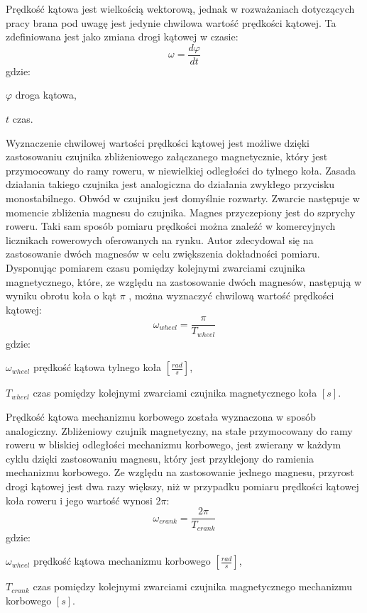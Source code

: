 Prędkość kątowa jest wielkością wektorową, jednak w rozważaniach dotyczących pracy brana pod uwagę jest jedynie chwilowa wartość prędkości kątowej. Ta zdefiniowana jest jako zmiana drogi kątowej w czasie:
\begin{equation}
    \omega = \frac{d\varphi}{dt}
    \label{eq:predkoscKatowa}
\end{equation}
gdzie:
\begin{eqwhere}[2cm]
	\item[$\varphi$] droga kątowa,
	\item[$t$] czas.
\end{eqwhere}
Wyznaczenie chwilowej wartości prędkości kątowej jest możliwe dzięki zastosowaniu czujnika zbliżeniowego załączanego magnetycznie, który jest przymocowany do ramy roweru, w niewielkiej odległości do tylnego koła. Zasada działania takiego czujnika jest analogiczna do działania zwykłego przycisku monostabilnego. Obwód w czujniku jest domyślnie rozwarty. Zwarcie następuje w momencie zbliżenia magnesu do czujnika. Magnes przyczepiony jest do szprychy roweru. Taki sam sposób pomiaru prędkości można znaleźć w komercyjnych licznikach rowerowych oferowanych na rynku. Autor zdecydował się na zastosowanie dwóch magnesów w celu zwiększenia dokładności pomiaru. Dysponując pomiarem czasu pomiędzy kolejnymi zwarciami czujnika magnetycznego, które, ze względu na zastosowanie dwóch magnesów, następują w wyniku obrotu koła o kąt $\pi$ , można wyznaczyć chwilową wartość prędkości kątowej: 
\begin{equation}
    \omega_{wheel} = \frac{\pi}{T_{wheel}}
\end{equation}
gdzie:
\begin{eqwhere}[2cm]
    \item[$\omega_{wheel}$] prędkość kątowa tylnego koła $[\frac{rad}{s}]$,
	\item[$T_{wheel}$] czas pomiędzy kolejnymi zwarciami czujnika magnetycznego koła $[s]$.
\end{eqwhere}
Prędkość kątowa mechanizmu korbowego została wyznaczona w sposób analogiczny. Zbliżeniowy czujnik magnetyczny, na stałe przymocowany do ramy roweru w bliskiej odległości mechanizmu korbowego, jest zwierany w każdym cyklu dzięki zastosowaniu magnesu, który jest przyklejony do ramienia mechanizmu korbowego. Ze względu na zastosowanie jednego magnesu, przyrost drogi kątowej jest dwa razy większy, niż w przypadku pomiaru prędkości kątowej koła roweru i jego wartość wynosi 2$\pi$:
\begin{equation}
    \omega_{crank} = \frac{2\pi}{T_{crank}}
\end{equation}
gdzie:
\begin{eqwhere}[2cm]
    \item[$\omega_{wheel}$] prędkość kątowa mechanizmu korbowego $[\frac{rad}{s}]$,
	\item[$T_{crank}$] czas pomiędzy kolejnymi zwarciami czujnika magnetycznego mechanizmu korbowego $[s]$.
\end{eqwhere}
